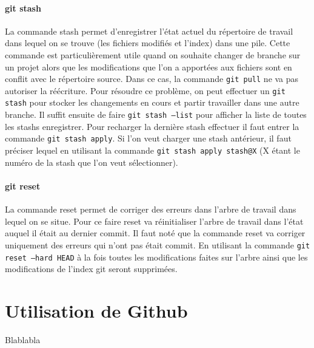 \documentclass[11pt,canadien]{article}
\begin{document}
\paragraph{git stash}La commande stash permet d'enregistrer l'état actuel du répertoire de travail dans lequel on se trouve (les fichiers modifiés et l'index) dans une pile. Cette commande est particulièrement utile quand on souhaite changer de branche sur un projet alors que les modifications que l'on a apportées aux fichiers sont en conflit avec le répertoire source. Dans ce cas, la commande \texttt{git pull} ne va pas autoriser la réécriture. Pour résoudre ce problème, on peut effectuer un \texttt{git stash} pour stocker les changements en cours et partir travailler dans une autre branche. Il suffit ensuite de faire \texttt{git stash --list} pour afficher la liste de toutes les stashs enregistrer. Pour recharger la dernière stash effectuer il faut entrer la commande \texttt{git stash apply}. Si l'on veut charger une stash antérieur, il faut préciser lequel en utilisant la commande \texttt{git stash apply stash@{X}} (X étant le numéro de la stash que l'on veut sélectionner). 

\paragraph{git reset}La commande reset permet de corriger des erreurs dans l'arbre de travail dans lequel on se situe. Pour ce faire reset va réinitialiser l'arbre de travail dans l'état auquel il était au dernier commit. Il faut noté que la commande reset va corriger uniquement des erreurs qui n'ont pas était commit. En utilisant la commande \texttt{git reset --hard HEAD} à la fois toutes les modifications faites sur l'arbre ainsi que les modifications de l'index git seront supprimées.


\section{Utilisation de Github}
Blablabla
\end{document}
